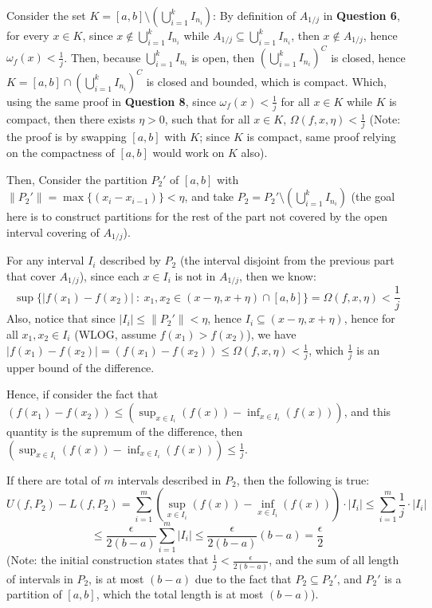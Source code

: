 \documentclass{article}
\begin{document}
\begin{itemize}
    Consider the set $K=[a,b]\setminus (\bigcup_{i=1}^{k} I_{n_i})$: By definition of $A_{1/j}$ in \textbf{Question 6}, for every $x\in K$, since $x\notin \bigcup_{i=1}^{k} I_{n_i}$ while $A_{1/j}\subseteq \bigcup_{i=1}^{k} I_{n_i}$, then $x\notin A_{1/j}$, hence $\omega_f(x)<\frac{1}{j}$.
    Then, because $\bigcup_{i=1}^{k} I_{n_i}$ is open, then $\left(\bigcup_{i=1}^{k} I_{n_i}\right)^C$ is closed, hence $K=[a,b]\cap \left(\bigcup_{i=1}^{k} I_{n_i}\right)^C$ is closed and bounded, which is compact.
    Which, using the same proof in \textbf{Question 8}, since $\omega_f(x)<\frac{1}{j}$ for all $x\in K$ while $K$ is compact, then there exists $\eta>0$, such that for all $x\in K$,
    $\Omega(f,x,\eta)<\frac{1}{j}$ (Note: the proof is by swapping $[a,b]$ with $K$; since $K$ is compact, same proof relying on the compactness of $[a,b]$ would work on $K$ also).

    Then, Consider the partition $P_2'$ of $[a,b]$ with $\|P_2'\|=\max\{(x_i-x_{i-1})\}<\eta$, and take $P_2 = P_2'\setminus (\bigcup_{i=1}^{k}I_{n_i})$
    (the goal here is to construct partitions for the rest of the part not covered by the open interval covering of $A_{1/j}$).

    \hfill

    For any interval $I_i$ described by $P_2$ (the interval disjoint from the previous part that cover $A_{1/j}$), since each $x\in I_i$ is not in $A_{1/j}$,
    then we know: 
    $$\sup\{|f(x_1)-f(x_2)|\ :\ x_1,x_2\in (x-\eta,x+\eta)\cap [a,b]\} =\Omega(f,x,\eta)<\frac{1}{j}$$
    Also, notice that since $|I_i| \leq \|P_2'\| < \eta$, hence $I_i\subseteq (x-\eta,x+\eta)$, hence for all $x_1,x_2\in I_i$ (WLOG, assume $f(x_1)>f(x_2)$),
    we have $|f(x_1)-f(x_2)|=(f(x_1)-f(x_2))\leq  \Omega(f,x,\eta)<\frac{1}{j}$, which $\frac{1}{j}$ is an upper bound of the difference.

    Hence, if consider the fact that $(f(x_1)-f(x_2))\leq \left(\sup_{x\in I_i}(f(x))-\inf_{x\in I_i}(f(x))\right)$, and this quantity is the supremum of the difference,
    then $(\sup_{x\in I_i}(f(x))-\inf_{x\in I_i}(f(x))) \leq \frac{1}{j}$. 

    If there are total of $m$ intervals described in $P_2$, then the following is true:
    $$U(f,P_2)-L(f,P_2) = \sum_{i=1}^{m}(\sup_{x\in I_i}(f(x))-\inf_{x\in I_i}(f(x)))\cdot |I_i| \leq \sum_{i=1}^{m}\frac{1}{j}\cdot|I_i|$$
    $$\leq \frac{\epsilon}{2(b-a)}\sum_{i=1}^{m}|I_i| \leq \frac{\epsilon}{2(b-a)}(b-a)=\frac{\epsilon}{2}$$
    (Note: the initial construction states that $\frac{1}{j}<\frac{\epsilon}{2(b-a)}$, and the sum of all length of intervals in $P_2$, is at most $(b-a)$ due to the fact that $P_2\subseteq P_2'$, and $P_2'$ is a partition of $[a,b]$, which the total length is at most $(b-a)$).


\end{itemize}
\end{document}
